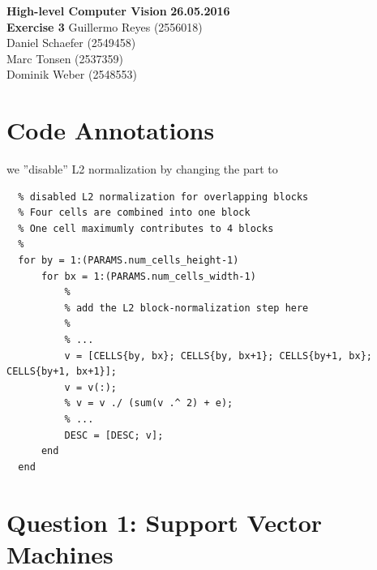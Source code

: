 \documentclass[12pt]{article}
\begin{document}

\noindent
{\Large \textbf{High-level Computer Vision}} \hfill \textbf{26.05.2016}\\
{\Large \textbf{Exercise 3}} 
\raggedleft \hfill Guillermo Reyes (2556018)\\
\hfill Daniel Schaefer (2549458)\\
\hfill Marc Tonsen (2537359)\\
\hfill Dominik Weber (2548553)\\

\raggedright


\section*{Code Annotations}
we ''disable'' L2 normalization by changing the part to
\begin{verbatim}
  % disabled L2 normalization for overlapping blocks 
  % Four cells are combined into one block
  % One cell maximumly contributes to 4 blocks
  %
  for by = 1:(PARAMS.num_cells_height-1)
      for bx = 1:(PARAMS.num_cells_width-1)
          %
          % add the L2 block-normalization step here
          %
          % ...
          v = [CELLS{by, bx}; CELLS{by, bx+1}; CELLS{by+1, bx}; CELLS{by+1, bx+1}];
          v = v(:);
          % v = v ./ (sum(v .^ 2) + e);
          % ...
          DESC = [DESC; v];
      end
  end

\end{verbatim}




\section*{Question 1: Support Vector Machines}
\end{document}
